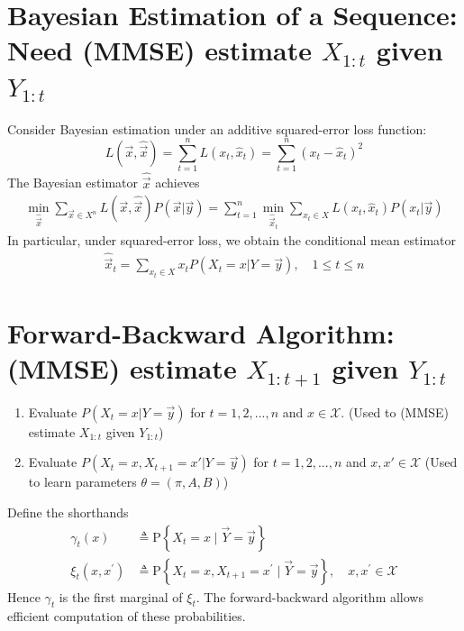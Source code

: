 \documentclass[11pt]{elegantbook}
\begin{document}
\section{Bayesian Estimation of a Sequence: Need (MMSE) estimate $X_{1:t}$ given $Y_{1:t}$}
Consider Bayesian estimation under an additive squared-error loss function: $$L(\vec{x},\hat{\vec{x}})=\sum_{t=1}^nL(x_t,\hat{x}_t)=\sum_{t=1}^n\left(x_t-\hat{x}_t\right)^2$$
The Bayesian estimator $\hat{\vec{x}}$ achieves
\begin{equation}
    \begin{aligned}
        \min_{\hat{\vec{x}}}\sum_{\vec{x}\in X^n}L(\vec{x},\hat{\vec{x}})P(\vec{x}|\vec{y})=\sum_{t=1}^n\min_{\hat{\vec{x}}_t}\sum_{x_t\in X}L(x_t,\hat{x}_t)P(x_t|\vec{y})
    \end{aligned}
    \nonumber
\end{equation}
In particular, under squared-error loss, we obtain the conditional mean estimator
\begin{equation}
    \begin{aligned}
        \hat{\vec{x}}_t=\sum_{x_t\in X}x_t P\left(X_t=x|Y=\vec{y}\right),\quad 1\leq t\leq n
    \end{aligned}
    \nonumber
\end{equation}

\section{Forward-Backward Algorithm: (MMSE) estimate $X_{1:t+1}$ given $Y_{1:t}$}
\begin{enumerate}
    \item Evaluate $P\left(X_t=x|Y=\vec{y}\right)$ for $t=1,2,...,n$ and $x\in \mathcal{X}$. (Used to (MMSE) estimate $X_{1:t}$ given $Y_{1:t}$)
    \item Evaluate $P\left(X_t=x,X_{t+1}=x'|Y=\vec{y}\right)$ for $t=1,2,...,n$ and $x,x'\in \mathcal{X}$ (Used to learn parameters $\theta=(\pi,A,B)$)
\end{enumerate}
Define the shorthands
$$
\begin{aligned}
\gamma_t(x) & \triangleq \mathrm{P}\left\{X_t=x \mid \vec{Y}=\vec{y}\right\} \\
\xi_t\left(x, x^{\prime}\right) & \triangleq \mathrm{P}\left\{X_t=x, X_{t+1}=x^{\prime} \mid \vec{Y}=\vec{y}\right\}, \quad x, x^{\prime} \in \mathcal{X}
\end{aligned}
$$
Hence $\gamma_t$ is the first marginal of $\xi_t$. The forward-backward algorithm allows efficient computation of these probabilities.
\end{document}
